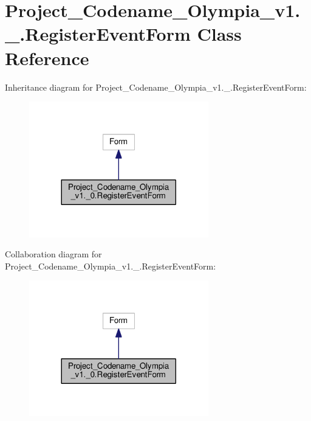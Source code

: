 \hypertarget{classProject__Codename__Olympia__v1_1_1__0_1_1RegisterEventForm}{}\section{Project\+\_\+\+Codename\+\_\+\+Olympia\+\_\+v1.\+\_.\+Register\+Event\+Form Class Reference}
\label{classProject__Codename__Olympia__v1_1_1__0_1_1RegisterEventForm}


Inheritance diagram for Project\+\_\+\+Codename\+\_\+\+Olympia\+\_\+v1.\+\_.\+Register\+Event\+Form\+:
\nopagebreak
\begin{figure}[H]
\begin{center}
\leavevmode
\includegraphics[width=221pt]{classProject__Codename__Olympia__v1_1_1__0_1_1RegisterEventForm__inherit__graph}
\end{center}
\end{figure}


Collaboration diagram for Project\+\_\+\+Codename\+\_\+\+Olympia\+\_\+v1.\+\_.\+Register\+Event\+Form\+:
\nopagebreak
\begin{figure}[H]
\begin{center}
\leavevmode
\includegraphics[width=221pt]{classProject__Codename__Olympia__v1_1_1__0_1_1RegisterEventForm__coll__graph}
\end{center}
\end{figure}
